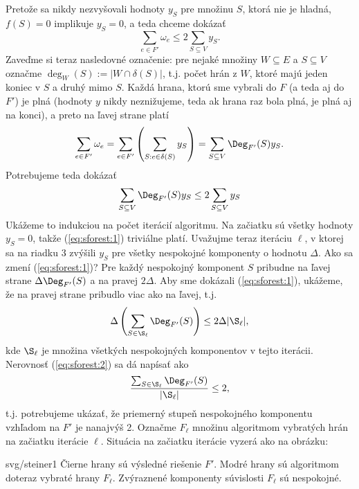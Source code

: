 \begin{dokaz}
  Pretože sa nikdy nezvyšovali hodnoty $y_S$ pre množinu $S$, ktorá nie je
  hladná,  $f(S)=0$ implikuje  $y_S=0$, a teda chceme dokázať $$\sum_{e\in
  F'}\omega_e \le 2 \sum_{S\subseteq V}y_S.$$ 
  Zaveďme si teraz nasledovné označenie: pre nejaké množiny $W\subseteq E$ a $S\subseteq V$ 
  označme  $\deg_W(S):=|W\cap\delta(S)|$, t.j. počet hrán z $W$, ktoré majú jeden koniec v $S$ a druhý mimo $S$.
  Každá hrana, ktorú sme vybrali do
  $F$ (a teda aj do $F'$) je plná (hodnoty $y$ nikdy neznižujeme, teda ak hrana
  raz bola plná, je plná aj na konci), a preto na ľavej strane platí 
  $$\sum_{e\in F'}\omega_e=\sum_{e\in F'}\left(\sum_{S:e\in\delta(S)}y_S\right)
  =\sum_{S\subseteq V}\Deg_{F'}(S)y_S
  .$$
  Potrebujeme teda dokázať
  \begin{equation}
    \label{eq:sforest:1}
    \sum_{S\subseteq V}\Deg_{F'}(S)y_S\le 2 \sum_{S\subseteq V}y_S
  \end{equation}
  Ukážeme to indukciou na počet iterácií algoritmu. Na začiatku
  sú všetky hodnoty $y_S=0$, takže (\ref{eq:sforest:1}) triviálne platí. 
  Uvažujme teraz iteráciu $\ell$, v ktorej sa na riadku 3 zvýšili $y_S$ pre všetky nespokojné komponenty
  o hodnotu $\Delta$. Ako sa zmení (\ref{eq:sforest:1})? 
  Pre každý nespokojný komponent $S$ pribudne  
  na ľavej strane  $\Delta\Deg_{F'}(S)$
  a na pravej $2\Delta$. Aby sme dokázali  (\ref{eq:sforest:1}), ukážeme, že na pravej strane pribudlo viac ako
  na ľavej, t.j.
  \begin{equation}
     \label{eq:sforest:2}
  \Delta\left(\sum_{S\in\S_\ell}\Deg_{F'}(S)\right)
  \le 2\Delta|\S_\ell|,
\end{equation}
  kde $\S_\ell$ je množina všetkých nespokojných komponentov v tejto iterácii.
  Nerovnosť  (\ref{eq:sforest:2}) sa dá napísať ako
  $$\frac{\sum_{S\in\S_\ell}\Deg_{F'}(S)}{|\S_\ell|}\le2,$$
  t.j. potrebujeme ukázať, že priemerný stupeň nespokojného komponentu vzhľadom na $F'$ je nanajvýš 2.
  Označme $F_\ell$ množinu algoritmom vybratých hrán na začiatku iterácie $\ell$.
  Situácia na začiatku iterácie vyzerá ako na obrázku:

\begin{myfig}{0.8\textwidth}{svg/steiner1}
Čierne hrany sú výsledné riešenie $F'$. Modré hrany sú 
algoritmom doteraz vybraté hrany $F_\ell$. 
Zvýraznené komponenty súvislosti $F_\ell$ sú nespokojné.
\end{myfig}


\end{dokaz}
